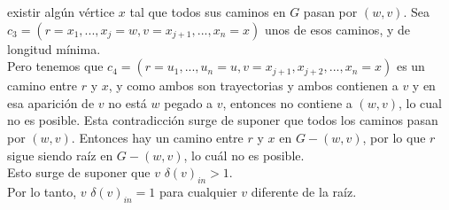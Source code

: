 \documentclass[12pt,a4paper]{report}
\begin{document}
\begin{enumerate}
{\begin{itemize}
{					existir algún vértice $x$ tal que todos sus caminos en $G$ pasan por
					$(w, v)$. Sea $c_3 = (r = x_1, ..., x_j = w, v = x_{j+1}, ..., x_n = x)$
					unos de esos caminos, y de longitud mínima.\\
					Pero tenemos que $c_4 = (r = u_1, ..., u_n = u, v = x_{j+1}, x_{j+2}, ..., x_n = x)$
					es un camino entre $r$ y $x$, y como ambos son trayectorias y ambos contienen
					a $v$ y en esa aparición de $v$ no está $w$ pegado a $v$, entonces no
					contiene a $(w, v)$, lo cual no es posible. Esta contradicción surge de
					suponer que todos los caminos pasan por $(w, v)$. Entonces hay un camino
					entre $r$ y $x$ en  $G - {(w, v)}$, por lo que $r$ sigue siendo raíz en
					$G - {(w, v)}$, lo cuál no es posible.\\
					Esto surge de suponer que $v$ $\delta(v)_{in} > 1$.\\
					Por lo tanto, $v$ $\delta(v)_{in} = 1$ para cualquier $v$ diferente de la
					raíz.\\
				}


\end{itemize}}
\end{enumerate}
\end{document}
